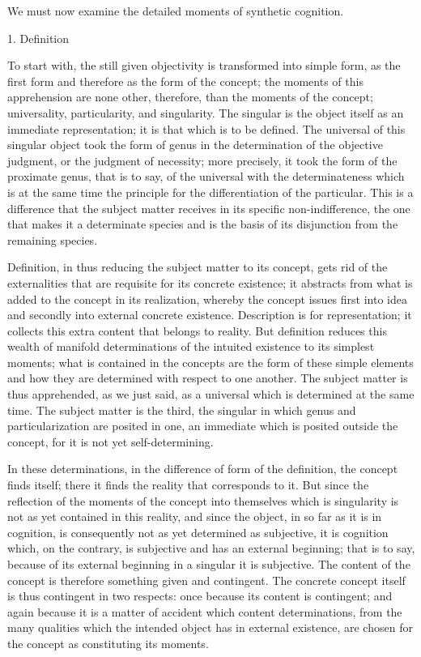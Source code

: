 We must now examine the detailed
moments of synthetic cognition.

1. Definition

To start with, the still given objectivity is
transformed into simple form, as the first form
and therefore as the form of the concept;
the moments of this apprehension are none other, therefore,
than the moments of the concept;
universality, particularity, and singularity.
The singular is the object itself as
an immediate representation;
it is that which is to be defined.
The universal of this singular object
took the form of genus in
the determination of the objective judgment,
or the judgment of necessity;
more precisely, it took the form of the proximate genus,
that is to say, of the universal with the determinateness
which is at the same time the principle for
the differentiation of the particular.
This is a difference that the subject matter
receives in its specific non-indifference,
the one that makes it a determinate species
and is the basis of its disjunction
from the remaining species.

Definition, in thus reducing
the subject matter to its concept,
gets rid of the externalities
that are requisite for its concrete existence;
it abstracts from what is added
to the concept in its realization,
whereby the concept issues first into idea
and secondly into external concrete existence.
Description is for representation;
it collects this extra content that belongs to reality.
But definition reduces this
wealth of manifold determinations of
the intuited existence to its simplest moments;
what is contained in the concepts are
the form of these simple elements
and how they are determined
with respect to one another.
The subject matter is thus apprehended, as we just said,
as a universal which is determined at the same time.
The subject matter is the third,
the singular in which genus and particularization
are posited in one,
an immediate which is posited outside the concept,
for it is not yet self-determining.

In these determinations,
in the difference of form of the definition,
the concept finds itself;
there it finds the reality that corresponds to it.
But since the reflection of the moments of
the concept into themselves
which is singularity is not as yet contained in this reality,
and since the object, in so far as it is in cognition,
is consequently not as yet determined as subjective,
it is cognition which, on the contrary, is
subjective and has an external beginning;
that is to say, because of its external
beginning in a singular it is subjective.
The content of the concept is
therefore something given and contingent.
The concrete concept itself is thus contingent in two respects:
once because its content is contingent;
and again because it is a matter of accident
which content determinations, from the many qualities
which the intended object has in external existence,
are chosen for the concept as constituting its moments.

